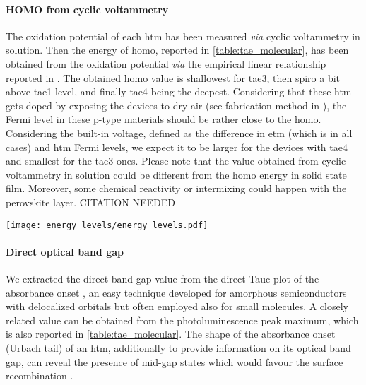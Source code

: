 \paragraph{HOMO from cyclic voltammetry}
The oxidation potential of each \gls{htm} has been measured \textsl{via} cyclic voltammetry in solution.
Then the energy of \gls{homo}, reported in \cref{table:tae_molecular}, has been obtained from the oxidation potential \textsl{via} the empirical linear relationship reported in .
The obtained \gls{homo} value is shallowest for \gls{tae3}, then \gls{spiro} a bit above \gls{tae1} level, and finally \gls{tae4} being the deepest.
Considering that these \gls{htm} gets doped by exposing the devices to dry air (see fabrication method in ), the Fermi level in these p-type materials should be rather close to the \gls{homo}.
Considering the built-in voltage, defined as the difference in \gls{etm} (which is  in all cases) and \gls{htm} Fermi levels, we expect it to be larger for the devices with \gls{tae4} and smallest for the \gls{tae3} ones.
Please note that the value obtained from cyclic voltammetry in solution could be different from the \gls{homo} energy in solid state film.
Moreover, some chemical reactivity or intermixing could happen with the perovskite layer. CITATION NEEDED

\begin{SCfigure}
	\centering
	\texttt{[image: energy\_levels/energy\_levels.pdf]}
	\label{fig:tae-energy_levels}
\end{SCfigure}

\paragraph{Direct optical band gap}
We extracted the direct band gap value from the direct Tauc plot of the absorbance onset \cite{WikipediaTauc}, an easy technique developed for amorphous semiconductors \cite{Stenzel2005} with delocalized orbitals but often employed also for small molecules.
A closely related value can be obtained from the photoluminescence peak maximum, which is also reported in \cref{table:tae_molecular}.
The shape of the absorbance onset (Urbach tail) of an \gls{htm}, additionally to provide information on its optical band gap, can reveal the presence of mid-gap states which would favour the surface recombination \cite{Tvingstedt2017}.

